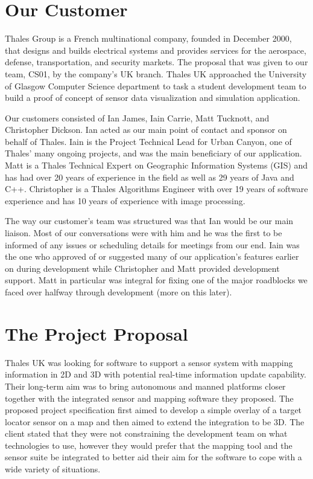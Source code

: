 \documentclass{l3proj}
\begin{document}
\section{Our Customer}

Thales Group is a French multinational company, founded in December 2000, that designs and builds electrical systems and provides services for the aerospace, defense, transportation, and security markets.\cite{thales} The proposal that was given to our team, CS01, by the company’s UK branch. Thales UK\cite{thalesUK} approached the University of Glasgow Computer Science department to task a student development team to build a proof of concept of sensor data visualization and simulation application.

Our customers consisted of Ian James, Iain Carrie, Matt Tucknott, and Christopher Dickson. Ian acted as our main point of contact and sponsor on behalf of Thales. Iain is the Project Technical Lead for Urban Canyon, one of Thales’ many ongoing projects, and was the main beneficiary of our application. Matt is a Thales Technical Expert on Geographic Information Systems (GIS)\cite{gis}  and has had over 20 years of experience in the field as well as 29 years of Java and C++. Christopher is a Thales Algorithms Engineer with over 19 years of software experience and has 10 years of experience with image processing.

The way our customer’s team was structured was that Ian would be our main liaison. Most of our conversations were with him and he was the first to be informed of any issues or scheduling details for meetings from our end. Iain was the one who approved of or suggested many of our application’s features earlier on during development while Christopher and Matt provided development support. Matt in particular was integral for fixing one of the major roadblocks we faced over halfway through development (more on this later). 

\section{The Project Proposal}

Thales UK was looking for software to support a sensor system with mapping information in 2D and 3D with potential real-time information update capability. Their long-term aim was to bring autonomous and manned platforms closer together with the integrated sensor and mapping software they proposed. The proposed project specification first aimed to develop a simple overlay of a target locator sensor on a map and then aimed to extend the integration to be 3D. The client stated that they were not constraining the development team on what technologies to use, however they would prefer that the mapping tool and the sensor suite be integrated to better aid their aim for the software to cope with a wide variety of situations.
\end{document}
